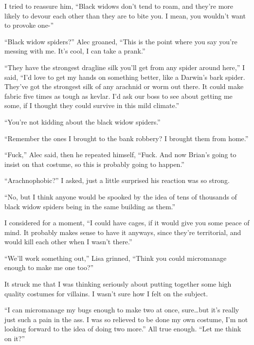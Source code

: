 I tried to reassure him, ``Black widows don't tend to roam, and they're more likely to devour each other than they are to bite you.  I mean, you wouldn't want to provoke one-''



``Black widow spiders?'' Alec groaned, ``This is the point where you say you're messing with me.  It's cool, I can take a prank.''



``They have the strongest dragline silk you'll get from any spider around here,'' I said, ``I'd love to get my hands on something better, like a Darwin's bark spider.  They've got the strongest silk of any arachnid or worm out there.  It could make fabric five times as tough as kevlar.  I'd ask our boss to see about getting me some, if I thought they could survive in this mild climate.''



``You're not kidding about the black widow spiders.''



``Remember the ones I brought to the bank robbery?  I brought them from home.''



``Fuck,'' Alec said, then he repeated himself, ``Fuck. And now Brian's going to insist on that costume, so this is probably going to happen.''



``Arachnophobic?'' I asked, just a little surprised his reaction was so strong.



``No, but I think anyone would be spooked by the idea of tens of thousands of black widow spiders being in the same building as them.''



I considered for a moment, ``I could have cages, if it would give you some peace of mind.  It probably makes sense to have it anyways, since they're territorial, and would kill each other when I wasn't there.''



``We'll work something out,'' Lisa grinned, ``Think you could micromanage enough to make me one too?''



It struck me that I was thinking seriously about putting together some high quality costumes for villains.  I wasn't sure how I felt on the subject.



``I can micromanage my bugs enough to make two at once, sure\ldots but it's really just such a pain in the ass.  I was so relieved to be done my own costume, I'm not looking forward to the idea of doing two more.''  All true enough.  ``Let me think on it?''



